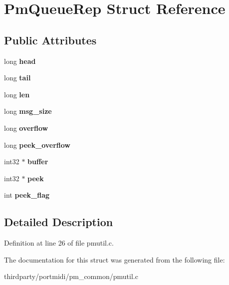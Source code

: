 \hypertarget{struct_pm_queue_rep}{}\section{Pm\+Queue\+Rep Struct Reference}
\label{struct_pm_queue_rep}
\subsection*{Public Attributes}
\begin{DoxyCompactItemize}
\item 
\mbox{\label{struct_pm_queue_rep_ab516ccc6cedbf2ab076e63ad122c10a5}} 
long {\bfseries head}
\item 
\mbox{\label{struct_pm_queue_rep_a86aa2ed3eb0f43260058824bd92c5993}} 
long {\bfseries tail}
\item 
\mbox{\label{struct_pm_queue_rep_a6e3749a77433a84bb26f7d89521adc5c}} 
long {\bfseries len}
\item 
\mbox{\label{struct_pm_queue_rep_a35ea1514e5a5a0f4f2016ccd4855dbde}} 
long {\bfseries msg\+\_\+size}
\item 
\mbox{\label{struct_pm_queue_rep_a5fcbe9d90e738fb69b03ba7f2b847581}} 
long {\bfseries overflow}
\item 
\mbox{\label{struct_pm_queue_rep_af9438f2bc2eff84f6902984c50da0a41}} 
long {\bfseries peek\+\_\+overflow}
\item 
\mbox{\label{struct_pm_queue_rep_a21bb583f33788a1010072f04e8b521b9}} 
int32 $\ast$ {\bfseries buffer}
\item 
\mbox{\label{struct_pm_queue_rep_affca0ae34a45211259d40e9a4da55adb}} 
int32 $\ast$ {\bfseries peek}
\item 
\mbox{\label{struct_pm_queue_rep_a0f8497e77d985f47c126077d232219b0}} 
int {\bfseries peek\+\_\+flag}
\end{DoxyCompactItemize}


\subsection{Detailed Description}


Definition at line 26 of file pmutil.\+c.



The documentation for this struct was generated from the following file\+:\begin{DoxyCompactItemize}
\item 
thirdparty/portmidi/pm\+\_\+common/pmutil.\+c\end{DoxyCompactItemize}
